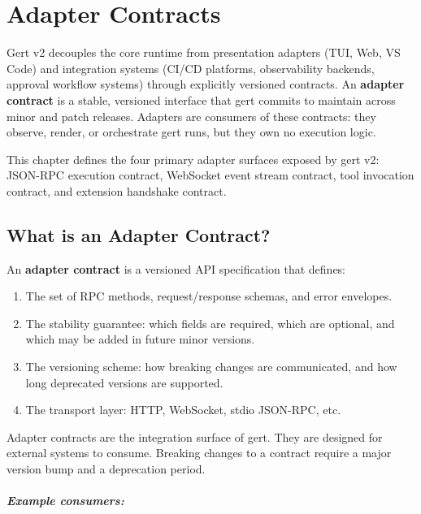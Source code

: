 \chapter{Adapter Contracts}

Gert v2 decouples the core runtime from presentation adapters (TUI, Web, VS
Code) and integration systems (CI/CD platforms, observability backends, approval
workflow systems) through explicitly versioned contracts.  An \textbf{adapter
contract} is a stable, versioned interface that gert commits to maintain across
minor and patch releases.  Adapters are consumers of these contracts: they
observe, render, or orchestrate gert runs, but they own no execution logic.

This chapter defines the four primary adapter surfaces exposed by gert v2:
JSON-RPC execution contract, WebSocket event stream contract, tool invocation
contract, and extension handshake contract.

\section{What is an Adapter Contract?}
\label{sec:adapter-contract-definition}

An \textbf{adapter contract} is a versioned API specification that defines:

\begin{enumerate}
  \item The set of RPC methods, request/response schemas, and error envelopes.
  \item The stability guarantee: which fields are required, which are optional,
        and which may be added in future minor versions.
  \item The versioning scheme: how breaking changes are communicated, and how
        long deprecated versions are supported.
  \item The transport layer: HTTP, WebSocket, stdio JSON-RPC, etc.
\end{enumerate}

Adapter contracts are the integration surface of gert.  They are designed for
external systems to consume.  Breaking changes to a contract require a major
version bump and a deprecation period.

\paragraph{Example consumers:}

